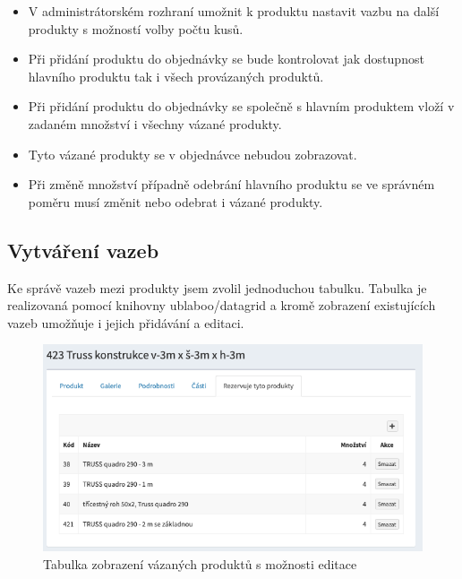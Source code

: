 \begin{itemize}
    \item V administrátorském rozhraní umožnit k produktu nastavit vazbu na další produkty s možností volby počtu kusů.
    \item Při přidání produktu do objednávky se bude kontrolovat jak dostupnost hlavního produktu tak i všech provázaných produktů.
    \item Při přidání produktu do objednávky se společně s hlavním produktem vloží v zadaném množství i všechny vázané produkty.
    \item Tyto vázané produkty se v objednávce nebudou zobrazovat.
    \item Při změně množství případně odebrání hlavního produktu se ve správném poměru musí změnit nebo odebrat i vázané produkty.

\end{itemize}

\subsection{Vytváření vazeb}

Ke správě vazeb mezi produkty jsem zvolil jednoduchou tabulku. Tabulka je realizovaná pomocí knihovny ublaboo/datagrid \cite{contributteContributteDatagrid} a kromě zobrazení existujících vazeb umožňuje i jejich přidávání a editaci.

\begin{figure}
    \centering
    \includegraphics[width=0.75\linewidth]{vazane-produkty.png}
    \caption{Tabulka zobrazení vázaných produktů s možnosti editace}
    \label{fig:enter-label}
\end{figure}



